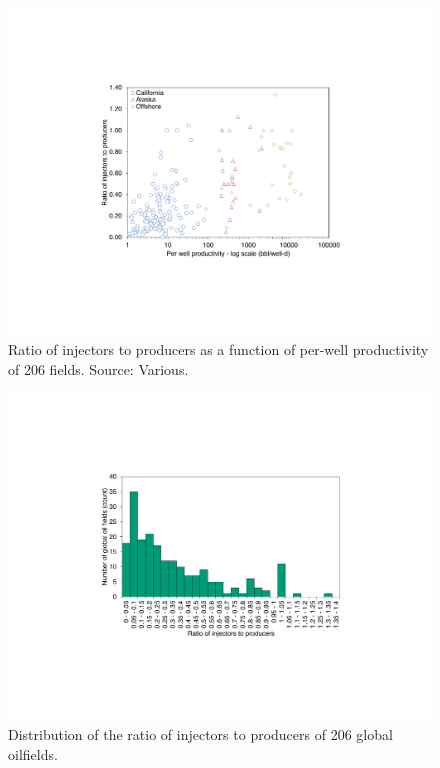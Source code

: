 \documentclass[11pt]{report}
\begin{document}
\begin{figure}[t]
\includegraphics[width=0.8\columnwidth]{images/inj_prod.pdf}
\caption{Ratio of injectors to producers as a function of per-well productivity of 206 fields. Source: Various.}
\label{fig:inj_prod}
\end{figure}

\begin{figure}[t]
\includegraphics[width=0.8\columnwidth]{images/inj_prod_hist.pdf}
\caption{Distribution of the ratio of injectors to producers of 206 global oilfields.}
\label{fig:inj_prod_hist}
\end{figure}
\end{document}
